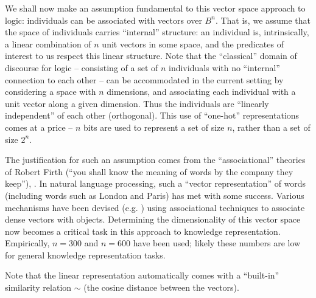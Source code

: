 \documentclass{article} %
\begin{document}
We shall now make an assumption fundamental to this vector space approach to logic: individuals can be associated with vectors over \(B^n\). That is, we assume that the space of individuals carries ``internal'' structure: an individual is, intrinsically, a linear combination of \(n\) unit vectors in some space, and the predicates of interest to us respect this linear structure. Note that the ``classical'' domain of discourse for logic -- consisting of a set of \(n\) individuals with no ``internal'' connection to each other -- can be accommodated in the current setting by considering a space with \(n\) dimensions, and associating each individual with a unit vector along a given dimension. Thus the individuals are ``linearly independent'' of each other (orthogonal). This use of ``one-hot'' representations comes at a price -- $n$ bits are used to represent a set of size \(n\), rather than a set of size \(2^n\). %

The justification for such an assumption  comes from the ``associational'' theories of Robert Firth (``you shall know the meaning of words by the company they keep''), \cite{firth-57}. In natural language processing, such a ``vector representation'' of words (including words such as {\sc London} and {\sc Paris}) has met with some success.  Various mechanisms have been devised (e.g.{} \cite{word-to-vec}) using associational techniques to associate dense vectors with objects. Determining the dimensionality of this vector space now becomes a critical task in this approach to knowledge representation. Empirically, \(n=300\) and \(n=600\) have been used; likely these numbers are low for general knowledge representation tasks. 

Note that the linear representation automatically comes with a ``built-in'' similarity relation $\sim$ (the cosine distance between the vectors).

\end{document}
